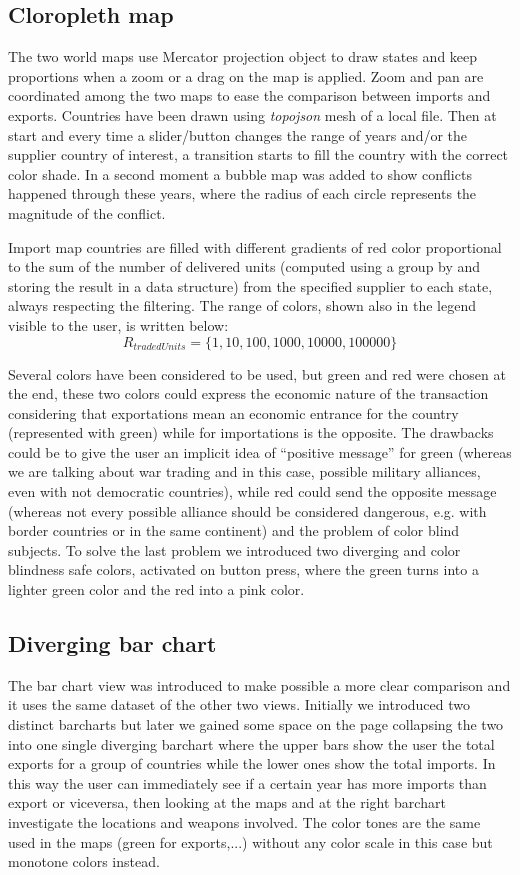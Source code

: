 \documentclass{article}
\begin{document}
\begin{multicols}{2}
\subsection{Cloropleth map}
The two world maps use Mercator projection object to draw states and keep proportions when a zoom or a drag on the map is applied. Zoom and pan are coordinated among the two maps to ease the comparison between imports and exports. Countries have been drawn using \textit{topojson} mesh of a local file. Then at start and every time a slider/button changes the range of years and/or the supplier country of interest, a transition starts to fill the country with the correct color shade. In a second moment a bubble map was added to show conflicts happened through these years, where the radius of each circle represents the magnitude of the conflict.  

Import map countries are filled with different gradients of red  color proportional to the sum of the number of delivered units (computed using a group by and storing the result in a data structure) from the specified supplier to each state, always respecting the filtering. The range of colors, shown also in the legend visible to the user, is written below:
$$R_{tradedUnits}=\{1,10,100,1000,10000,100000\}$$

Several colors have been considered to be used, but green and red were chosen at the end, these two colors could express the economic nature of the transaction considering that exportations mean an economic entrance for the country (represented with green) while for importations is the opposite.
The drawbacks could be to give the user an implicit idea of “positive message” for green (whereas we are talking about war trading and in this case, possible military alliances, even with not democratic countries), while red could send the opposite message (whereas not every possible alliance should be considered dangerous, e.g. with border countries or in the same continent) and the problem of color blind subjects. To solve the last problem we introduced two diverging and color blindness safe colors, activated on button press, where the green turns into a lighter green color and the red into a pink color.


\subsection{Diverging bar chart}

The bar chart view was introduced to make possible a more clear comparison and it uses the same dataset of the other two views. Initially we introduced two distinct barcharts but later we gained some space on the page collapsing the two into one single diverging barchart where the upper bars show the user the total exports for a group of countries while the lower ones show the total imports. In this way the user can immediately see  if a certain year has more imports than export or viceversa, then looking at the maps and at the right barchart investigate the locations and weapons involved. The color tones are the same used in the maps (green for exports,...) without any color scale in this case but monotone colors instead.  


\end{multicols}
\end{document}

